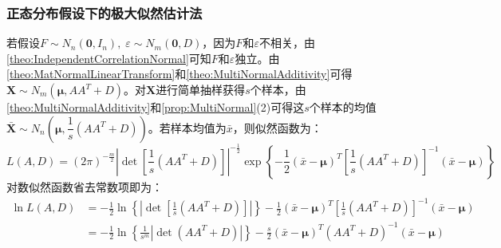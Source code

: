 \subsubsection{正态分布假设下的极大似然估计法}
\begin{derivation}
	若假设$F\sim N_n(\mathbf{0},I_n),\;\varepsilon\sim N_m(\mathbf{0},D)$，因为$F$和$\varepsilon$不相关，由\cref{theo:IndependentCorrelationNormal}可知$F$和$\varepsilon$独立。由\cref{theo:MatNormalLinearTransform}和\cref{theo:MultiNormalAdditivity}可得$\mathbf{X}\sim N_m(\boldsymbol{\mu},AA^T+D)$。对$\mathbf{X}$进行简单抽样获得$s$个样本，由\cref{theo:MultiNormalAdditivity}和\cref{prop:MultiNormal}(2)可得这$s$个样本的均值$\bar{\mathbf{X}}\sim N_n\left(\boldsymbol{\mu},\dfrac{1}{s}(AA^T+D)\right)$。若样本均值为$\bar{x}$，则似然函数为：
	\begin{equation*}
		L(A,D)=(2\pi)^{-\frac{m}{2}}|\det[\frac{1}{s}(AA^T+D)]|^{-\frac{1}{2}}\exp\left\{-\frac{1}{2}(\bar{x}-\boldsymbol{\mu})^T\left[\frac{1}{s}(AA^T+D)\right]^{-1}(\bar{x}-\boldsymbol{\mu})\right\}
	\end{equation*}
	对数似然函数省去常数项即为：
	\begin{align*}
		\ln L(A,D)&=-\frac{1}{2}\ln\left\{\left|\det\left[\frac{1}{s}(AA^T+D)\right]\right|\right\}-\frac{1}{2}(\bar{x}-\boldsymbol{\mu})^T\left[\frac{1}{s}(AA^T+D)\right]^{-1}(\bar{x}-\boldsymbol{\mu}) \\
		&=-\frac{1}{2}\ln\left\{\frac{1}{s^m}\left|\det(AA^T+D)\right|\right\}-\frac{s}{2}(\bar{x}-\boldsymbol{\mu})^T(AA^T+D)^{-1}(\bar{x}-\boldsymbol{\mu})
	\end{align*}
\end{derivation}

